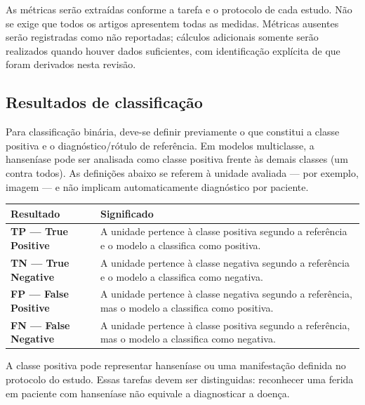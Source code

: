 As métricas serão extraídas conforme a tarefa e o protocolo de cada
estudo. Não se exige que todos os artigos apresentem todas as medidas.
Métricas ausentes serão registradas como não reportadas; cálculos
adicionais somente serão realizados quando houver dados suficientes, com
identificação explícita de que foram derivados nesta revisão.

\subsection{Resultados de
classificação}\label{resultados-de-classificauxe7uxe3o}

Para classificação binária, deve-se definir previamente o que constitui
a classe positiva e o diagnóstico/rótulo de referência. Em modelos
multiclasse, a hanseníase pode ser analisada como classe positiva frente
às demais classes (um contra todos). As definições abaixo se referem à
unidade avaliada --- por exemplo, imagem --- e não implicam
automaticamente diagnóstico por paciente.

{\def\LTcaptype{none} %
\begin{longtable}[]{@{}
  >{\raggedright\arraybackslash}p{}
  >{\raggedright\arraybackslash}p{}@{}}
\toprule\noalign{}
\begin{minipage}[b]{\linewidth}\raggedright
Resultado
\end{minipage} & \begin{minipage}[b]{\linewidth}\raggedright
Significado
\end{minipage} \\
\midrule\noalign{}
\endhead
\bottomrule\noalign{}
\endlastfoot
\textbf{TP --- True Positive} & A unidade pertence à classe positiva
segundo a referência e o modelo a classifica como positiva. \\
\textbf{TN --- True Negative} & A unidade pertence à classe negativa
segundo a referência e o modelo a classifica como negativa. \\
\textbf{FP --- False Positive} & A unidade pertence à classe negativa
segundo a referência, mas o modelo a classifica como positiva. \\
\textbf{FN --- False Negative} & A unidade pertence à classe positiva
segundo a referência, mas o modelo a classifica como negativa. \\
\end{longtable}
}

A classe positiva pode representar hanseníase ou uma manifestação
definida no protocolo do estudo. Essas tarefas devem ser distinguidas:
reconhecer uma ferida em paciente com hanseníase não equivale a
diagnosticar a doença.

